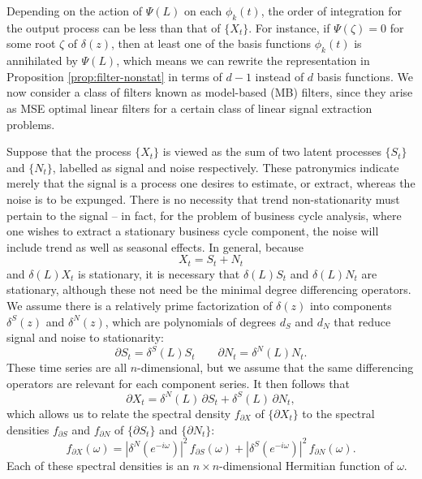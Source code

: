 \documentclass[a4paper]{book}
\begin{document}
  
Depending on the action of $\Psi (L) $ on each $\phi_k (t)$, the order of
 integration for the output process can be less than that of $\{ X_t \}$.
 For instance, if $\Psi (\zeta) = 0$ for some root $\zeta$ of $\delta (z)$,
  then at least one of the basis functions $\phi_k (t)$ is annihilated by
   $\Psi (L)$, which means we can rewrite the representation in 
   Proposition \ref{prop:filter-nonstat} in terms of $d-1$ instead of $d$ basis
   functions.  We now consider a class of filters known as model-based (MB) filters,
  since they arise as MSE optimal linear filters for a certain class of linear
  signal extraction problems.
  
  Suppose that the process $\{ X_t \}$ is viewed as the sum of two latent processes
  $\{ S_t \}$ and $\{ N_t \}$, labelled as signal and noise respectively.
   These patronymics indicate merely that the signal is a process one desires
  to estimate, or extract, whereas the noise is to be expunged.  There is no necessity
  that trend non-stationarity must pertain to the signal -- in fact, for the problem
  of business cycle analysis, where one wishes to extract a stationary business cycle
  component, the noise will include trend as well as seasonal effects.
  In general, because
\[
 X_t = S_t + N_t
\]
 and $\delta (L) X_t$ is stationary, it is necessary that $\delta (L) S_t$ and 
  $\delta (L) N_t$ are stationary, although these not need be the minimal degree
  differencing operators.  We assume there is a relatively prime factorization of
  $\delta (z)$ into components $\delta^S (z)$ and $\delta^N (z)$, which are polynomials
  of degrees $d_S$ and $d_N$ that reduce signal and noise to stationarity:
\[
  \partial S_t = \delta^S (L) S_t \qquad \partial N_t = \delta^N (L) N_t.
\]
  These time series are all $n$-dimensional, but we assume that the same differencing
  operators are relevant for each component series.  It then follows that
\[
 \partial X_t = \delta^N (L) \, \partial S_t + \delta^S (L) \, \partial N_t,
\]
 which allows us to relate the spectral density $f_{\partial X}$ of $\{ \partial X_t \}$
 to the spectral densities $f_{\partial S}$
  and $f_{\partial N}$ of $\{ \partial S_t \}$ and $\{ \partial N_t \}$:
 \begin{equation}
 \label{eq:sig-and-noise.sdf}
 f_{\partial X} (\omega) = {| \delta^N (e^{-i \omega}) |}^2 \, f_{\partial S} (\omega)
  + {| \delta^S (e^{-i \omega}) |}^2 \, f_{\partial N} (\omega).
 \end{equation}
  Each of these spectral densities
   is an $n \times n$-dimensional Hermitian function of $\omega$.
\end{document}
